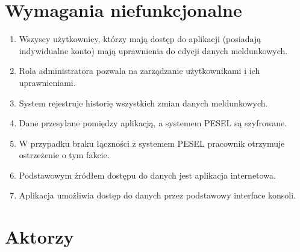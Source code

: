 \documentclass[12pt]{article}
\begin{document}
\section{Wymagania niefunkcjonalne}
\begin{enumerate}
    \item Wszyscy użytkownicy, którzy mają dostęp do aplikacji (posiadają indywidualne konto) mają uprawnienia do edycji danych meldunkowych.
    \item Rola administratora pozwala na zarządzanie użytkownikami i ich uprawnieniami.
    \item System rejestruje historię wszystkich zmian danych meldunkowych.
    \item Dane przesyłane pomiędzy aplikacją, a systemem PESEL są szyfrowane.
    \item W przypadku braku łączności z systemem PESEL pracownik otrzymuje ostrzeżenie o tym fakcie.
    \item Podstawowym źródłem dostępu do danych jest aplikacja internetowa.
    \item Aplikacja umożliwia dostęp do danych przez podstawowy interface konsoli.
\end{enumerate}
\newpage

\section{Aktorzy}
\end{document}
